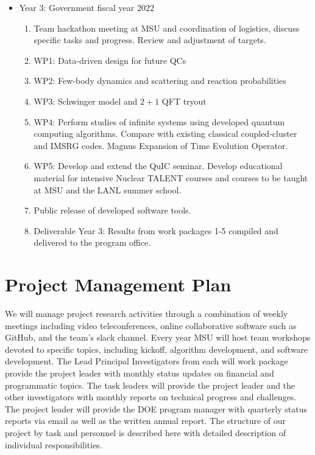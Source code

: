 \documentclass[11pt]{article}
\begin{document}
\begin{itemize}
    \item Year 3: Government fiscal year 2022
    \begin{enumerate}
        \item  Team hackathon meeting at MSU and coordination of logistics, discuss specific tasks and progress. Review and adjustment of targets.
        \item WP1: Data-driven design for future QCs 
\item WP2: Few-body dynamics and scattering and reaction probabilities
\item WP3: Schwinger model and $2+1$ QFT tryout
\item WP4: Perform studies of  infinite systems using developed quantum computing algorithms. Compare with existing classical coupled-cluster and IMSRG codes. Magnus Expansion of Time Evolution Operator.
\item WP5: Develop and extend the QuIC seminar. Develop educational material for intensive Nuclear TALENT courses and courses to be taught at MSU and the LANL summer school. 
\item Public release of developed software tools.
\item Deliverable Year 3: Results from work packages 1-5 compiled and delivered to the program office.
    \end{enumerate}
    
\end{itemize}

\section{Project Management Plan}
We will manage project research activities through a combination of weekly meetings including
video teleconferences, online collaborative software such as GitHub, and the team’s slack channel.
Every year MSU will host team workshops devoted to specific topics, including kickoff,
algorithm development, and software development. The Lead Principal Investigators from each will work package provide the project leader with monthly status updates on financial and programmatic
topics. The task leaders will provide the project leader and the other investigators
with monthly reports on technical progress and challenges. The project leader will provide the
DOE program manager with quarterly status reports via email as well as the written annual report.
The structure of our project by task and personnel is described here with detailed
description of individual responsibilities.
\end{document}
